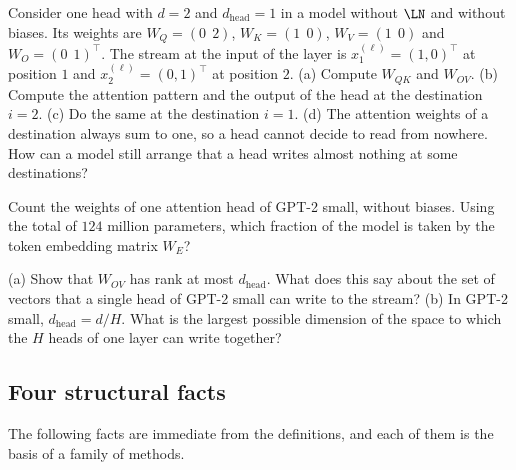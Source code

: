 \begin{exercise}\label{ex:byhand}
Consider one head with $d=2$ and $d_{\mathrm{head}}=1$ in a model without $\LN$ and without biases. Its weights are
$W_Q=(0\ \ 2)$, $W_K=(1\ \ 0)$, $W_V=(1\ \ 0)$ and $W_O=(0\ \ 1)^\top$. The stream at the input of the layer is
$x_1^{(\ell)}=(1,0)^\top$ at position $1$ and $x_2^{(\ell)}=(0,1)^\top$ at position $2$. (a) Compute $W_{QK}$ and
$W_{OV}$. (b) Compute the attention pattern and the output of the head at the destination $i=2$. (c) Do the same
at the destination $i=1$. (d) The attention weights of a destination always sum to one, so a head cannot decide
to read from nowhere. How can a model still arrange that a head writes almost nothing at some destinations?
\end{exercise}

\begin{exercise}\label{ex:params}
Count the weights of one attention head of GPT-2 small, without biases. Using the total of $124$ million
parameters, which fraction of the model is taken by the token embedding matrix $W_E$?
\end{exercise}

\begin{exercise}\label{ex:rank}
(a) Show that $W_{OV}$ has rank at most $d_{\mathrm{head}}$. What does this say about the set of vectors that a
single head of GPT-2 small can write to the stream? (b) In GPT-2 small, $d_{\mathrm{head}}=d/H$. What is the
largest possible dimension of the space to which the $H$ heads of one layer can write together?
\end{exercise}

\subsection{Four structural facts}
\label{sec:facts}

The following facts are immediate from the definitions, and each of them is the basis of a family of methods.

